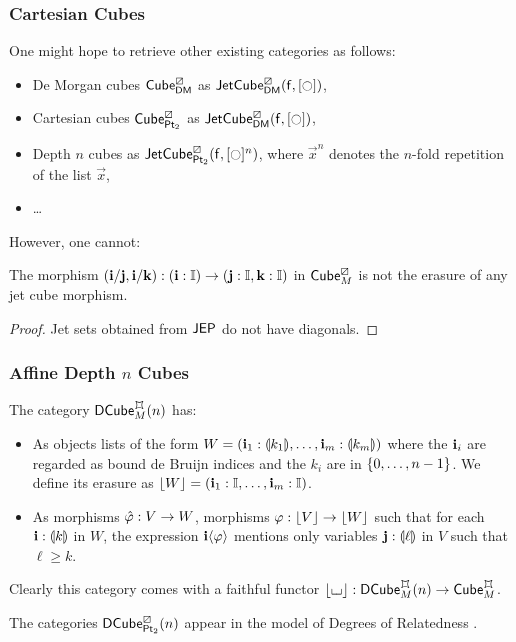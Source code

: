 \documentclass[a4paper]{memoir}
\begin{document}
\subsubsection{Cartesian Cubes}
One might hope to retrieve other existing categories as follows:
\begin{itemize}
	\item De Morgan cubes ${\mathsf{Cube}}^\boxslash_{\mathsf{DM}}$ \cite{cubical} as $\jetcubefwd{\cartes}{\demorgan}{[\npolar]}$,
	\item Cartesian cubes ${\mathsf{Cube}}^\boxslash_{\mathsf{Pt}_2}$ as $\jetcubefwd{\cartes}{\demorgan}{[\npolar]}$,
	\item Depth $n$ cubes \cite{reldtt,reldtt-techreport} as $\jetcubefwd{\cartes}{\bipointed}{[\npolar]^n}$, where $\vec x^n$ denotes the $n$-fold repetition of the list $\vec x$,
	\item \ldots
\end{itemize}
However, one cannot:
\begin{proposition}
	The morphism $(\mathbf{i} / \mathbf{j}, \mathbf{i} / \mathbf{k}) : (\mathbf{i} : {\mathbb I}) \to (\mathbf{j} : {\mathbb I}, \mathbf{k} : {\mathbb I})$ in ${\mathsf{Cube}}^\boxslash_M$ is not the erasure of any jet cube morphism.
\end{proposition}
\begin{proof}
	Jet sets obtained from $\mathsf{JEP}$ do not have diagonals.
\end{proof}

\subsubsection{Affine Depth $n$ Cubes}
\begin{definition}
	The category $\dcubeopt \mycubex M n$ has:
	\begin{itemize}
		\item As objects lists of the form $W = (\mathbf{i}_1 : {\llparenthesis k_1 \rrparenthesis}, \ldots, \mathbf{i}_m : {\llparenthesis k_m \rrparenthesis})$ where the $\mathbf{i}_i$ are regarded as bound de Bruijn indices and the $k_i$ are in $\mathopen{}\left\{ 0, \ldots, n-1 \right\}\mathclose{}$.
		We define its erasure as $\mathopen{}\left\lfloor W \right\rfloor\mathclose{} = (\mathbf{i}_1 : {\mathbb I}, \ldots, \mathbf{i}_m : {\mathbb I})$.
		\item As morphisms $\hat{\varphi} : V \to W$, morphisms $\varphi : \mathopen{}\left\lfloor V \right\rfloor\mathclose{} \to \mathopen{}\left\lfloor W \right\rfloor\mathclose{}$ such that for each $\mathbf{i} : {\llparenthesis k \rrparenthesis}$ in $W$, the expression $\mathbf{i}\langle \varphi \rangle$ mentions only variables $\mathbf{j} : {\llparenthesis \ell \rrparenthesis}$ in $V$ such that $\ell \geq k$.
	\end{itemize}
	Clearly this category comes with a faithful functor $\erasejc \loch : \dcubeopt \mycubex M n \to \cubecat^\mycubex_M$.
\end{definition}
The categories ${\mathsf{DCube}}^{\boxslash}_{{\mathsf{Pt}_2}}\mathopen{}\left( n \right)\mathclose{}$ appear in the model of Degrees of Relatedness \cite{reldtt,reldtt-techreport}.
\end{document}
